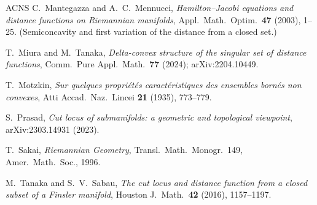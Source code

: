 \documentclass[11pt]{article}
\theoremstyle{remark}
\begin{document}
\begin{thebibliography}{ACNS}
 C.~Mantegazza and A.~C.~Mennucci, \emph{Hamilton--Jacobi
equations and distance functions on Riemannian manifolds}, Appl.\
Math.\ Optim.\ \textbf{47} (2003), 1--25. (Semiconcavity and first
variation of the distance from a closed set.)

 T.~Miura and M.~Tanaka, \emph{Delta-convex structure
of the singular set of distance functions}, Comm.\ Pure Appl.\
Math.\ \textbf{77} (2024); arXiv:2204.10449.

 T.~Motzkin, \emph{Sur quelques propri\'et\'es
caract\'eristiques des ensembles born\'es non convexes}, Atti Accad.\
Naz.\ Lincei \textbf{21} (1935), 773--779.

\bibitem{Pra} S.~Prasad, \emph{Cut locus of submanifolds: a
geometric and topological viewpoint}, arXiv:2303.14931 (2023).

\bibitem{Sak} T.~Sakai, \emph{Riemannian Geometry}, Transl.\
Math.\ Monogr.\ 149, Amer.\ Math.\ Soc., 1996.

 M.~Tanaka and S.~V.~Sabau, \emph{The cut locus and
distance function from a closed subset of a Finsler manifold},
Houston J.\ Math.\ \textbf{42} (2016), 1157--1197.

\end{thebibliography}
\end{document}
